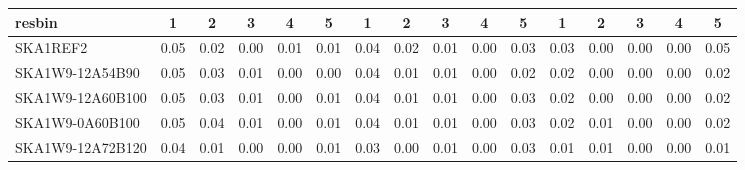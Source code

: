 \begin{table}[H]
{{\begin{tabular}{|lccccc||ccccc||ccccc|}
 resbin  &1 & 2 & 3 & 4 & 5 & 1 & 2 & 3 & 4 & 5 & 1 & 2 & 3 & 4 & 5 \\ \hline
SKA1REF2 & 0.05 \cellcolor{blue!60.00} & 0.02 \cellcolor{red!39.00} & 0.00 \cellcolor{green!18.00} & 0.01 \cellcolor{orange!60.00} & 0.01 \cellcolor{purple!60.00} & 0.04 \cellcolor{blue!60.00} & 0.02 \cellcolor{red!60.00} & 0.01 \cellcolor{green!18.00} & 0.00 \cellcolor{orange!18.00} & 0.03 \cellcolor{purple!60.00} & 0.03 \cellcolor{blue!60.00} & 0.00 \cellcolor{red!18.00} & 0.00 \cellcolor{green!18.00} & 0.00 \cellcolor{orange!18.00} & 0.05 \cellcolor{purple!60.00}\\ \hline 
SKA1W9-12A54B90 & 0.05 \cellcolor{blue!60.00} & 0.03 \cellcolor{red!49.50} & 0.01 \cellcolor{green!60.00} & 0.00 \cellcolor{orange!18.00} & 0.00 \cellcolor{purple!18.00} & 0.04 \cellcolor{blue!60.00} & 0.01 \cellcolor{red!39.00} & 0.01 \cellcolor{green!18.00} & 0.00 \cellcolor{orange!18.00} & 0.02 \cellcolor{purple!18.00} & 0.02 \cellcolor{blue!39.00} & 0.00 \cellcolor{red!18.00} & 0.00 \cellcolor{green!18.00} & 0.00 \cellcolor{orange!18.00} & 0.02 \cellcolor{purple!28.50}\\ \hline 
SKA1W9-12A60B100 & 0.05 \cellcolor{blue!60.00} & 0.03 \cellcolor{red!49.50} & 0.01 \cellcolor{green!60.00} & 0.00 \cellcolor{orange!18.00} & 0.01 \cellcolor{purple!60.00} & 0.04 \cellcolor{blue!60.00} & 0.01 \cellcolor{red!39.00} & 0.01 \cellcolor{green!18.00} & 0.00 \cellcolor{orange!18.00} & 0.03 \cellcolor{purple!60.00} & 0.02 \cellcolor{blue!39.00} & 0.00 \cellcolor{red!18.00} & 0.00 \cellcolor{green!18.00} & 0.00 \cellcolor{orange!18.00} & 0.02 \cellcolor{purple!28.50}\\ \hline 
SKA1W9-0A60B100 & 0.05 \cellcolor{blue!60.00} & 0.04 \cellcolor{red!60.00} & 0.01 \cellcolor{green!60.00} & 0.00 \cellcolor{orange!18.00} & 0.01 \cellcolor{purple!60.00} & 0.04 \cellcolor{blue!60.00} & 0.01 \cellcolor{red!39.00} & 0.01 \cellcolor{green!18.00} & 0.00 \cellcolor{orange!18.00} & 0.03 \cellcolor{purple!60.00} & 0.02 \cellcolor{blue!39.00} & 0.01 \cellcolor{red!60.00} & 0.00 \cellcolor{green!18.00} & 0.00 \cellcolor{orange!18.00} & 0.02 \cellcolor{purple!28.50}\\ \hline 
SKA1W9-12A72B120 & 0.04 \cellcolor{blue!39.00} & 0.01 \cellcolor{red!28.50} & 0.00 \cellcolor{green!18.00} & 0.00 \cellcolor{orange!18.00} & 0.01 \cellcolor{purple!60.00} & 0.03 \cellcolor{blue!39.00} & 0.00 \cellcolor{red!18.00} & 0.01 \cellcolor{green!18.00} & 0.00 \cellcolor{orange!18.00} & 0.03 \cellcolor{purple!60.00} & 0.01 \cellcolor{blue!18.00} & 0.01 \cellcolor{red!60.00} & 0.00 \cellcolor{green!18.00} & 0.00 \cellcolor{orange!18.00} & 0.01 \cellcolor{purple!18.00}\\ \hline 

\end{tabular}}}
\end{table}
